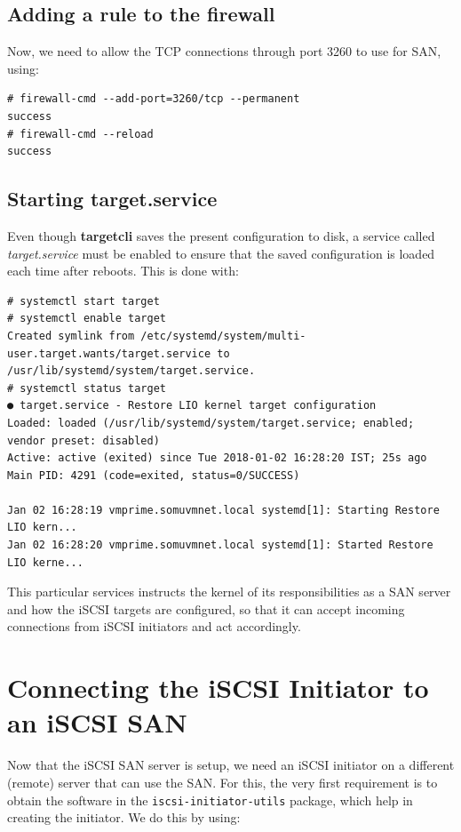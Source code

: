 \subsection{Adding a rule to the firewall}
Now, we need to allow the TCP connections through port 3260 to use for SAN, using:

\vspace{-15pt}
\begin{verbatim}
# firewall-cmd --add-port=3260/tcp --permanent 
success
# firewall-cmd --reload
success
\end{verbatim}
\vspace{-10pt}

\subsection{Starting target.service}
Even though \textbf{targetcli} saves the present configuration to disk, a service called \textit{target.service} must be enabled to ensure that the saved configuration is loaded each time after reboots. This is done with:

\vspace{-15pt}
\begin{verbatim}
# systemctl start target
# systemctl enable target
Created symlink from /etc/systemd/system/multi-user.target.wants/target.service to /usr/lib/systemd/system/target.service.
# systemctl status target
● target.service - Restore LIO kernel target configuration
Loaded: loaded (/usr/lib/systemd/system/target.service; enabled; vendor preset: disabled)
Active: active (exited) since Tue 2018-01-02 16:28:20 IST; 25s ago
Main PID: 4291 (code=exited, status=0/SUCCESS)

Jan 02 16:28:19 vmprime.somuvmnet.local systemd[1]: Starting Restore LIO kern...
Jan 02 16:28:20 vmprime.somuvmnet.local systemd[1]: Started Restore LIO kerne...
\end{verbatim}
\vspace{-10pt}	

\noindent
This particular services instructs the kernel of its responsibilities as a SAN server and how the iSCSI targets are configured, so that it can accept incoming connections from iSCSI initiators and act accordingly. 

	\section{Connecting the iSCSI Initiator to an iSCSI SAN}
Now that the iSCSI SAN server is setup, we need an iSCSI initiator on a different (remote) server that can use the SAN. For this, the very first requirement is to obtain the software in the \verb|iscsi-initiator-utils| package, which help in creating the initiator. We do this by using:

